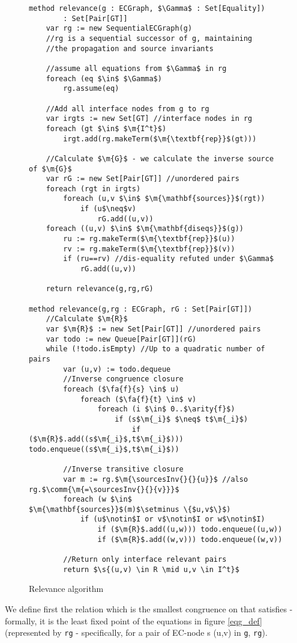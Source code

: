 \begin{figure}
\begin{lstlisting}
method relevance(g : ECGraph, $\Gamma$ : Set[Equality])
		: Set[Pair[GT]]
	var rg := new SequentialECGraph(g)
	//rg is a sequential successor of g, maintaining 
	//the propagation and source invariants
	
	//assume all equations from $\Gamma$ in rg
	foreach (eq $\in$ $\Gamma$)
		rg.assume(eq)
	
	//Add all interface nodes from g to rg
	var irgts := new Set[GT] //interface nodes in rg
	foreach (gt $\in$ $\m{I^t}$)
		irgt.add(rg.makeTerm($\m{\textbf{rep}}$(gt)))
	
	//Calculate $\m{G}$ - we calculate the inverse source of $\m{G}$
	var rG := new Set[Pair[GT]] //unordered pairs
	foreach (rgt in irgts)
		foreach (u,v $\in$ $\m{\mathbf{sources}}$(rgt))
			if (u$\neq$v)
				rG.add((u,v))
	foreach ((u,v) $\in$ $\m{\mathbf{diseqs}}$(g))
		ru := rg.makeTerm($\m{\textbf{rep}}$(u))
		rv := rg.makeTerm($\m{\textbf{rep}}$(v))
		if (ru==rv) //dis-equality refuted under $\Gamma$
			rG.add((u,v))
			
	return relevance(g,rg,rG)
	
method relevance(g,rg : ECGraph, rG : Set[Pair[GT]])
	//Calculate $\m{R}$
	var $\m{R}$ := new Set[Pair[GT]] //unordered pairs
	var todo := new Queue[Pair[GT]](rG)
	while (!todo.isEmpty) //Up to a quadratic number of pairs
		var (u,v) := todo.dequeue
		//Inverse congruence closure
		foreach ($\fa{f}{s} \in$ u) 
			foreach ($\fa{f}{t} \in$ v) 
				foreach (i $\in$ 0..$\arity{f}$)
					if (s$\m{_i}$ $\neq$ t$\m{_i}$)
						if ($\m{R}$.add((s$\m{_i}$,t$\m{_i}$))) todo.enqueue((s$\m{_i}$,t$\m{_i}$))
		
		//Inverse transitive closure
		var m := rg.$\m{\sourcesInv{}{}{u}}$ //also rg.$\comm{\m{=\sourcesInv{}{}{v}}}$
		foreach (w $\in$ $\m{\mathbf{sources}}$(m)$\setminus \{$u,v$\}$)
			if (u$\notin$I or v$\notin$I or w$\notin$I)
				if ($\m{R}$.add((u,w))) todo.enqueue((u,w))
				if ($\m{R}$.add((w,v))) todo.enqueue((w,v))
					
		//Return only interface relevant pairs
		return $\s{(u,v) \in R \mid u,v \in I^t}$
\end{lstlisting}
\caption{Relevance algorithm}
\label{relevance_algorithm}
\end{figure}

We define first the relation \m{\textcolor{blue}{\eqg}} which is the smallest congruence on  that satisfies \m{\Gamma} - formally, it is the least fixed point of the equations in figure \ref{eqg_def} (represented by \lstinline|rg| - specifically, for a pair of EC-node s (u,v) in \lstinline|g|, \lstinline|rg|).

